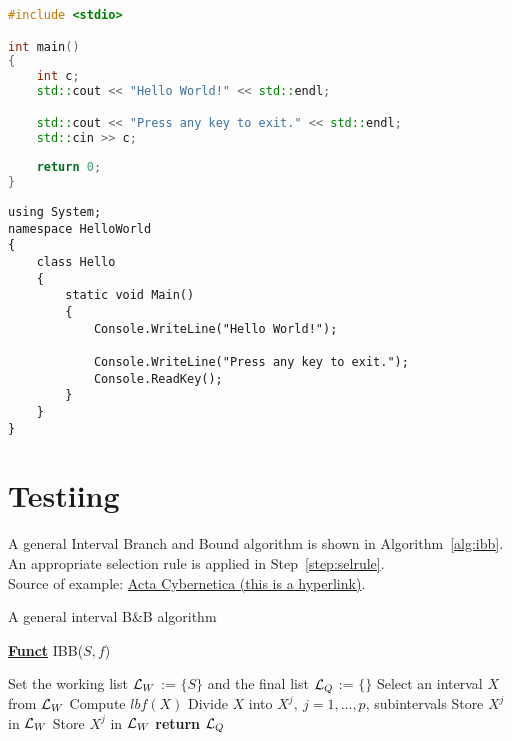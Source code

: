 \begin{lstlisting}[language={C++}]
#include <stdio>

int main() 
{
	int c;
	std::cout << "Hello World!" << std::endl;

	std::cout << "Press any key to exit." << std::endl;
	std::cin >> c;
	
	return 0;
}
\end{lstlisting}

\begin{lstlisting}[language={[Sharp]C}]
using System;
namespace HelloWorld
{
	class Hello 
	{
		static void Main() 
		{
			Console.WriteLine("Hello World!");
			
			Console.WriteLine("Press any key to exit.");
			Console.ReadKey();
		}
	}
}
\end{lstlisting}

\section{Testiing}

A general Interval Branch and Bound algorithm is shown in Algorithm~\ref{alg:ibb}. An appropriate selection rule is applied in Step~\ref{step:selrule}.\\
Source of example: \href{https://www.inf.u-szeged.hu/actacybernetica/}{Acta Cybernetica (this is a hyperlink)}.

\begin{algorithm}[H]
\caption{A general interval B\&B algorithm} 
\label{alg:ibb} 
\textbf{\underline{Funct}} IBB($S,f$)
\begin{algorithmic}[1] %
\State Set the working list ${\cal L}_W$ := $\{S\}$ and the final list ${\cal L}_Q$ := $\{\}$     
 \label{alg:igoend}
	\State  Select an interval $X$ from ${\cal L}_W$ \label{step:selrule}  
	\State Compute $lbf(X)$ 		  
	 
		\State Divide $X$ into $X^j,\ j=1,\dots, p$, subintervals   
			 
				\State Store $X^j$ in ${\cal L}_W$ 
			\Else
				\State Store $X^j$ in ${\cal L}_W$ 
			\EndIf
		\EndFor  
	\EndIf
\EndWhile
\State \textbf{return} ${\cal L}_Q$
\end{algorithmic}
\end{algorithm}
